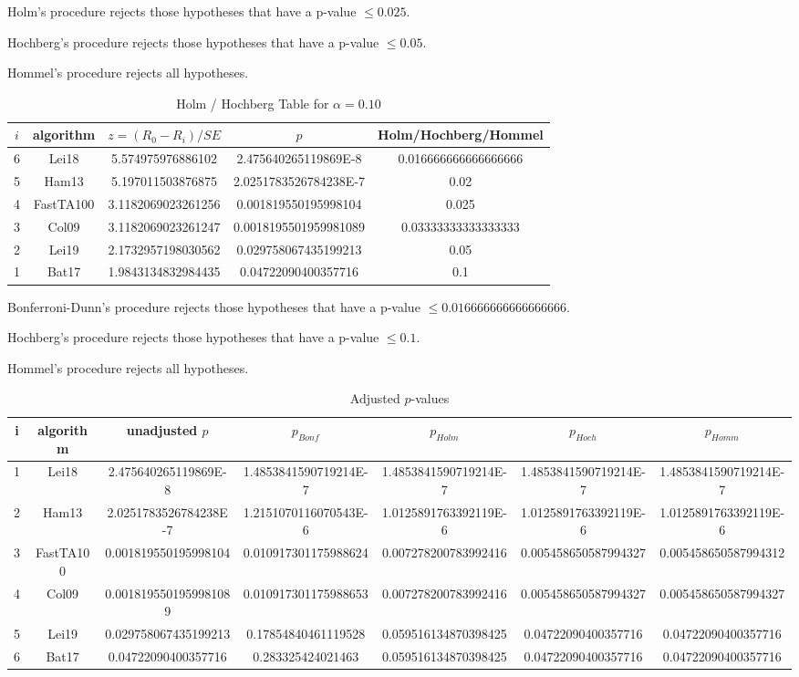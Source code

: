 \documentclass[a4paper,10pt]{article}
\begin{document}
\begin{landscape}
Holm's procedure rejects those hypotheses that have a p-value $\le0.025$.


Hochberg's procedure rejects those hypotheses that have a p-value $\le0.05$.


Hommel's procedure rejects all hypotheses.


\begin{table}[!htp]
\centering\tiny
\caption{Holm / Hochberg Table for $\alpha=0.10$}
\begin{tabular}{ccccc}
$i$&algorithm&$z=(R_0 - R_i)/SE$&$p$&Holm/Hochberg/Hommel\\
\hline
6&Lei18&5.574975976886102&2.475640265119869E-8&0.016666666666666666\\
5&Ham13&5.197011503876875&2.0251783526784238E-7&0.02\\
4&FastTA100&3.1182069023261256&0.001819550195998104&0.025\\
3&Col09&3.1182069023261247&0.0018195501959981089&0.03333333333333333\\
2&Lei19&2.1732957198030562&0.029758067435199213&0.05\\
1&Bat17&1.9843134832984435&0.04722090400357716&0.1\\
\hline
\end{tabular}
\end{table}
Bonferroni-Dunn's procedure rejects those hypotheses that have a p-value $\le0.016666666666666666$.


Hochberg's procedure rejects those hypotheses that have a p-value $\le0.1$.


Hommel's procedure rejects all hypotheses.


\begin{table}[!htp]
\centering\tiny
\caption{Adjusted $p$-values}
\begin{tabular}{ccccccc}
i&algorithm&unadjusted $p$&$p_{Bonf}$&$p_{Holm}$&$p_{Hoch}$&$p_{Homm}$\\
\hline
1&Lei18&2.475640265119869E-8&1.4853841590719214E-7&1.4853841590719214E-7&1.4853841590719214E-7&1.4853841590719214E-7\\
2&Ham13&2.0251783526784238E-7&1.2151070116070543E-6&1.0125891763392119E-6&1.0125891763392119E-6&1.0125891763392119E-6\\
3&FastTA100&0.001819550195998104&0.010917301175988624&0.007278200783992416&0.005458650587994327&0.005458650587994312\\
4&Col09&0.0018195501959981089&0.010917301175988653&0.007278200783992416&0.005458650587994327&0.005458650587994327\\
5&Lei19&0.029758067435199213&0.17854840461119528&0.059516134870398425&0.04722090400357716&0.04722090400357716\\
6&Bat17&0.04722090400357716&0.283325424021463&0.059516134870398425&0.04722090400357716&0.04722090400357716\\
\hline
\end{tabular}
\end{table}


\end{landscape}
\end{document}
